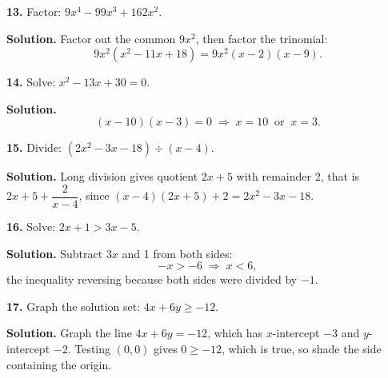 \documentclass{ximera}
\begin{document}
\begin{problem}

\textbf{13.} Factor: $9x^{4}-99x^{3}+162x^{2}$.

\begin{hint}
\textbf{Solution.} Factor out the common $9x^{2}$, then factor the trinomial:
\[
  9x^{2}\left(x^{2}-11x+18\right) = 9x^{2}(x-2)(x-9).
\]
\end{hint}
\end{problem}

\begin{problem}

\textbf{14.} Solve: $x^{2}-13x+30=0$.

\begin{hint}
\textbf{Solution.}
\[
  (x-10)(x-3)=0 \;\Longrightarrow\; x=10 \ \text{ or } \ x=3 .
\]
\end{hint}
\end{problem}

\begin{problem}

\textbf{15.} Divide: $\left(2x^{2}-3x-18\right)\div(x-4)$.

\begin{hint}
\textbf{Solution.} Long division gives quotient $2x+5$ with remainder 2, that is
$2x+5+\dfrac{2}{x-4}$, since $(x-4)(2x+5)+2=2x^{2}-3x-18$.
\end{hint}
\end{problem}

\begin{problem}

\textbf{16.} Solve: $2x+1>3x-5$.

\begin{hint}
\textbf{Solution.} Subtract $3x$ and 1 from both sides:
\[
  -x > -6 \;\Longrightarrow\; x < 6,
\]
the inequality reversing because both sides were divided by $-1$.
\end{hint}
\end{problem}

\begin{problem}

\textbf{17.} Graph the solution set: $4x+6y \ge -12$.

\begin{hint}
\textbf{Solution.} Graph the line $4x+6y=-12$, which has $x$-intercept $-3$ and
$y$-intercept $-2$. Testing $(0,0)$ gives $0 \ge -12$, which is true, so shade the side
containing the origin.
\figbox{\gridsm}
\end{hint}
\end{problem}
\end{document}
